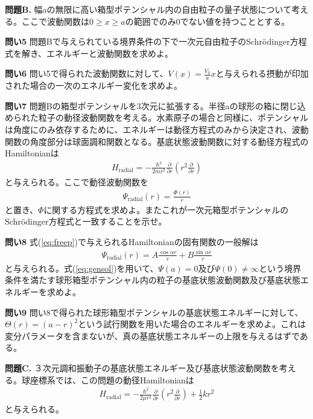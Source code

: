 \documentclass[11pt,pra,aps]{revtex4}
\begin{document}
\noindent
{\bf 問題B.} 幅aの無限に高い箱型ポテンシャル内の自由粒子の量子状態について考える。ここで波動関数は$0\geq x\geq a$の範囲でのみ0でない値を持つこととする。

\noindent
{\bf 問い5} 問題Bで与えられている境界条件の下で一次元自由粒子のSchr\"odinger方程式を解き、エネルギーと波動関数を求めよ。

\noindent
{\bf 問い6} 問い5で得られた波動関数に対して、$V(x)=\frac{V_0}{a}x$と与えられる摂動が印加された場合の一次のエネルギー変化を求めよ。

\noindent
{\bf 問い7} 問題Bの箱型ポテンシャルを3次元に拡張する。半径aの球形の箱に閉じ込められた粒子の動径波動関数を考える。水素原子の場合と同様に、ポテンシャルは角度にのみ依存するために、エネルギーは動径方程式のみから決定され、波動関数の角度部分は球面調和関数となる。基底状態波動関数に対する動径方程式のHamiltonianは
\begin{align}
  H_\text{radial}=-\frac{\hbar^2}{2mr^2}\frac{\partial}{\partial r}\left(r^2 \frac{\partial}{\partial r}\right) \label{eq:freep}
\end{align}    
と与えられる。ここで動径波動関数を
\begin{align}
  \Psi_\text{radial}(r)=\frac{\Phi(r)}{r}
\end{align}
と置き、$\Phi$に関する方程式を求めよ。またこれが一次元箱型ポテンシャルのSchr\"odinger方程式と一致することを示せ。

\noindent
{\bf 問い8} 式(\ref{eq:freep})で与えられるHamiltonianの固有関数の一般解は
\begin{align}
  \Psi_\text{radial}(r)=A\frac{\cos\alpha r}{r} + B\frac{\sin\alpha r}{r} \label{eq:gensol}
\end{align}
と与えられる。式(\ref{eq:gensol})を用いて、$\Psi(a)=0$及び$\Psi(0)\neq\infty$という境界条件を満たす球形箱型ポテンシャル内の粒子の基底状態波動関数及び基底状態エネルギーを求めよ。

\noindent
{\bf 問い9} 問い8で得られた球形箱型ポテンシャルの基底状態エネルギーに対して、$\Theta(r)=(a-r)^2$という試行関数を用いた場合のエネルギーを求めよ。これは変分パラメータを含まないが、真の基底状態エネルギーの上限を与えるはずである。

\noindent
{\bf 問題C.} ３次元調和振動子の基底状態エネルギー及び基底状態波動関数を考える。球座標系では、この問題の動径Hamiltonianは
\begin{align}
  H_\text{radial}=-\frac{\hbar^2}{2\mu r^2}\frac{\partial}{\partial r}\left(r^2 \frac{\partial}{\partial r}\right) + \frac{1}{2}kr^2\label{eq:3dp}
\end{align}    
と与えられる。
\end{document}
